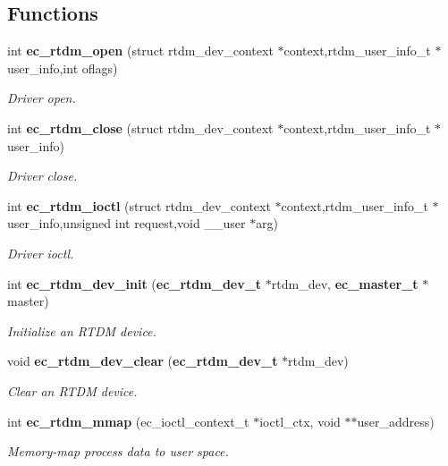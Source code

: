 \subsection*{Functions}
\begin{DoxyCompactItemize}
\item 
int {\bf ec\-\_\-rtdm\-\_\-open} (struct rtdm\-\_\-dev\-\_\-context $\ast$context,rtdm\-\_\-user\-\_\-info\-\_\-t $\ast$user\-\_\-info,int oflags)
\begin{DoxyCompactList}\small\item\em Driver open. \end{DoxyCompactList}\item 
int {\bf ec\-\_\-rtdm\-\_\-close} (struct rtdm\-\_\-dev\-\_\-context $\ast$context,rtdm\-\_\-user\-\_\-info\-\_\-t $\ast$user\-\_\-info)
\begin{DoxyCompactList}\small\item\em Driver close. \end{DoxyCompactList}\item 
int {\bf ec\-\_\-rtdm\-\_\-ioctl} (struct rtdm\-\_\-dev\-\_\-context $\ast$context,rtdm\-\_\-user\-\_\-info\-\_\-t $\ast$user\-\_\-info,unsigned int request,void \-\_\-\-\_\-user $\ast$arg)
\begin{DoxyCompactList}\small\item\em Driver ioctl. \end{DoxyCompactList}\item 
int {\bf ec\-\_\-rtdm\-\_\-dev\-\_\-init} ({\bf ec\-\_\-rtdm\-\_\-dev\-\_\-t} $\ast$rtdm\-\_\-dev, {\bf ec\-\_\-master\-\_\-t} $\ast$master)
\begin{DoxyCompactList}\small\item\em Initialize an R\-T\-D\-M device. \end{DoxyCompactList}\item 
void {\bf ec\-\_\-rtdm\-\_\-dev\-\_\-clear} ({\bf ec\-\_\-rtdm\-\_\-dev\-\_\-t} $\ast$rtdm\-\_\-dev)
\begin{DoxyCompactList}\small\item\em Clear an R\-T\-D\-M device. \end{DoxyCompactList}\item 
int {\bf ec\-\_\-rtdm\-\_\-mmap} (ec\-\_\-ioctl\-\_\-context\-\_\-t $\ast$ioctl\-\_\-ctx, void $\ast$$\ast$user\-\_\-address)
\begin{DoxyCompactList}\small\item\em Memory-\/map process data to user space. \end{DoxyCompactList}\end{DoxyCompactItemize}


